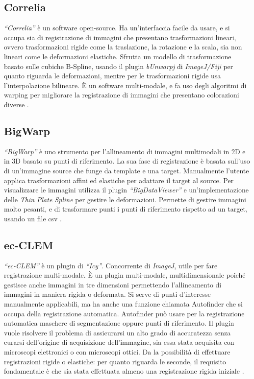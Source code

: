 \subsection{Correlia}
\textit{``Correlia''} è un software open-source. Ha un'interfaccia facile da usare, e si occupa sia di registrazione di immagini che presentano trasformazioni lineari, ovvero trasformazioni rigide come la traslazione, la rotazione e la scala, sia non lineari come le deformazioni elastiche. Sfrutta un modello di trasformazione basato sulle cubiche B-Spline, usando il plugin \textit{bUnwarpj} di \textit{ImageJ/Fiji} per quanto riguarda le deformazioni, mentre per le trasformazioni rigide usa l'interpolazione bilineare. È un software multi-modale, e fa uso degli algoritmi di warping per migliorare la registrazione di immagini che presentano colorazioni diverse \cite{https://doi.org/10.1111/jmi.12928}.

\subsection{BigWarp}
\textit{``BigWarp''} è uno strumento per l'allineamento di immagini multimodali in 2D e in 3D basato su punti di riferimento. La sua fase di registrazione è basata sull'uso di un'immagine source che funge da template e una target. Manualmente l'utente applica trasformazioni affini ed elastiche per adattare il target al source. Per visualizzare le immagini utilizza il plugin \textit{``BigDataViewer''} e un'implementazione delle \textit{Thin Plate Spline} per gestire le deformazioni. Permette di gestire immagini molto pesanti, e di trasformare punti i punti di riferimento rispetto ad un target, usando un file csv \cite{7493463}.

\subsection{ec-CLEM}
\textit{``ec-CLEM''} è un plugin di \textit{``Icy''}. Concorrente di \textit{ImageJ}, utile per fare registrazione multi-modale. È un plugin multi-modale, multidimensionale poiché gestisce anche immagini in tre dimensioni permettendo l'allineamento di immagini in maniera rigida o deformata. Si serve di punti d'interesse manualmente applicabili, ma ha anche una funzione chiamata Autofinder che si occupa della registrazione automatica. Autofinder può usare per la registrazione automatica maschere di segmentazione oppure punti di riferimento. Il plugin vuole risolvere il problema di assicurarsi un alto grado di accuratezza senza curarsi dell'origine di acquisizione dell'immagine, sia essa stata acquisita con microscopi elettronici o con microscopi ottici. Da la possibilità di effettuare registrazioni rigide o elastiche: per quanto riguarda le seconde, il requisito fondamentale è che sia stata effettuata almeno una registrazione rigida iniziale \cite{PaulGilloteaux2017}.


